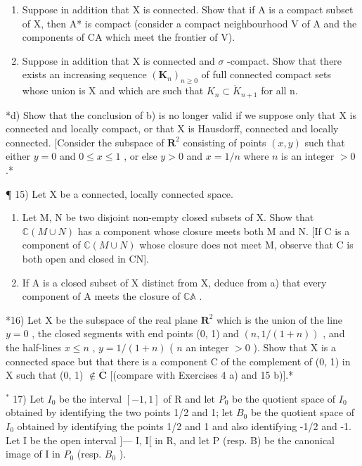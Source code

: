 \begin{enumerate}
\def\labelenumi{\alph{enumi})}
\setcounter{enumi}{1}
\item
  Suppose in addition that X is connected. Show that if A is a compact subset of X, then A* is compact (consider a compact neighbourhood V of A and the components of CA which meet the frontier of V).
\item
  Suppose in addition that X is connected and \(\sigma\) -compact. Show that there exists an increasing sequence \((\mathbf{K}_{n})_{n\geqslant0}\) of full connected compact sets whose union is X and which are such that \(K_{n}\subset\mathring{K}_{n+1}\) for all n.
\end{enumerate}

*d) Show that the conclusion of b) is no longer valid if we suppose only that X is connected and locally compact, or that X is Hausdorff, connected and locally connected. {[}Consider the subspace of \(\mathbf{R}^2\) consisting of points \((x, y)\) such that either \(y = 0\) and \(0 \leqslant x \leqslant 1\) , or else \(y > 0\) and \(x = 1/n\) where \(n\) is an integer \(> 0\) .*

¶ 15) Let X be a connected, locally connected space.

\begin{enumerate}
\def\labelenumi{\alph{enumi})}
\item
  Let M, N be two disjoint non-empty closed subsets of X. Show that \(\mathbb{C}(M \cup N)\) has a component whose closure meets both M and N. {[}If C is a component of \(\mathbb{C}(M \cup N)\) whose closure does not meet M, observe that C is both open and closed in CN{]}.
\item
  If A is a closed subset of X distinct from X, deduce from a) that every component of A meets the closure of \(\mathbb{C}\mathbb{A}\) .
\end{enumerate}

*16) Let X be the subspace of the real plane \(\mathbf{R}^2\) which is the union of the line \(y = 0\) , the closed segments with end points (0, 1) and \((n, 1/(1 + n))\) , and the half-lines \(x \leqslant n\) , \(y = 1/(1 + n)\) ( \(n\) an integer \(>0\) ). Show that X is a connected space but that there is a component C of the complement of (0, 1) in X such that (0, 1) \(\notin \overline{\mathbf{C}}\) {[}(compare with Exercises 4 a) and 15 b){]}.*

\(^{*}\) 17) Let \(I_{0}\) be the interval \([-1,1]\) of R and let \(P_{0}\) be the quotient space of \(I_{0}\) obtained by identifying the two points 1/2 and 1; let \(B_{0}\) be the quotient space of \(I_{0}\) obtained by identifying the points 1/2 and 1 and also identifying -1/2 and -1. Let I be the open interval {]}--- I, I{[} in R, and let P (resp. B) be the canonical image of I in \(P_{0}\) (resp. \(B_{0}\) ).

